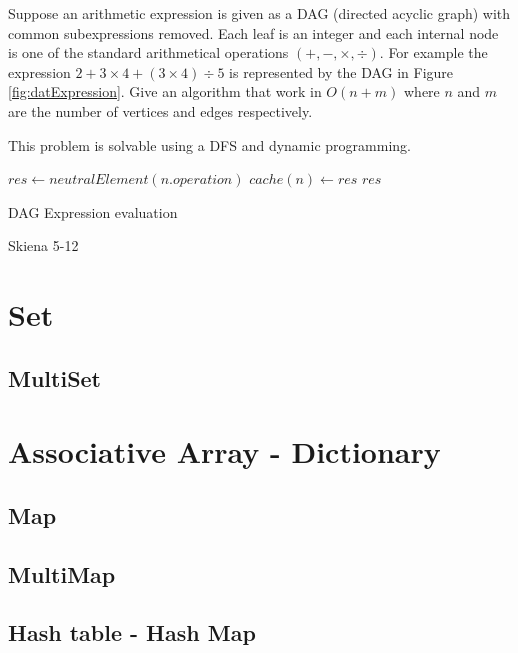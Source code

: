 \begin{problem}
Suppose an arithmetic expression is given as a DAG (directed acyclic graph)
with common subexpressions removed. Each leaf is an integer and each internal node is one of the standard arithmetical operations $(+, -, \times, \div )$.
For example the expression $2+3 \times 4 + (3 \times 4) \div 5$ is represented by the DAG in Figure \ref{fig:datExpression}. Give an algorithm that work in $O(n+m)$ where $n$ and $m$ are the number of vertices and edges respectively.


\begin{solution}
This problem is solvable using a DFS and dynamic programming.

\begin{algorithm}
  $res \gets neutralElement(n.operation)$\;
  $cache(n) \gets res$\;
  \Return $res$\;
 
\caption{DAG Expression evaluation}
\end{algorithm}


\end{solution}

\end{problem}


\begin{problem}
Skiena 5-12	

\begin{solution}



\end{solution}

\end{problem}




\chapter{Set}
\section{MultiSet}

\chapter{Associative Array - Dictionary}
\section{Map}
\section{MultiMap}
\section{Hash table - Hash Map}
	
\iffalse
http://www.tommyds.it/doc/benchmark.html
\fi